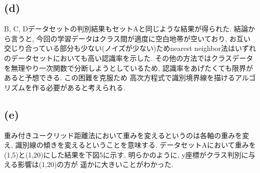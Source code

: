 \documentclass[10.5pt]{jsarticle}
\begin{document}
\subsection{(d)}
B, C, Dデータセットの判別結果もセットAと同じような結果が得られた. 結論から言うと, 今回の学習データはクラス間が適度に空白地帯が空いており,
お互い交じり合っている部分も少ない(ノイズが少ない)ためnearest neighbor法はいずれのデータセットにおいても高い認識率を示した.
その他の方法ではクラスデータを無理やり一次関数で分断しようとしているため, 認識率をあげたくても限界があると予想できる. この困難を克服ため
高次方程式で識別境界線を描けるアルゴリズムを作る必要があると考えられる.

\subsection{(e)}
重み付きユークリッド距離法において重みを変えるというのは各軸の重みを変え, 識別線の傾きを変えるということを意味する.
データセットAにおいて重みを(1,5)と(1,20)にした結果を下図5に示す. 明らかのように, y座標がクラス判別に与える影響は(1,20)の方が
遥かに大きいことがわかった.
\end{document}
